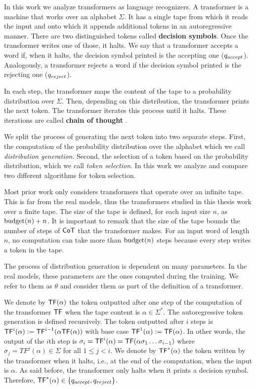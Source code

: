 In this work we analyze transformers as language recognizers.
A transformer is a machine that works over an alphabet $\Sigma$.
It has a single tape from which it reads the input and onto which it appends additional tokens in an autoregressive manner.
There are two distinguished tokens called \textbf{decision symbols}.
Once the transformer writes one of those, it halts.
We say that a transformer accepts a word if, when it halts, the decision symbol printed is the accepting one ($q_{accept}$).
Analogously, a transformer rejects a word if the decision symbol printed is the rejecting one ($q_{reject}$).

In each step, the transformer maps the content of the tape to a probability distribution over $\Sigma$.
Then, depending on this distribution, the transformer prints the next token.
The transformer iterates this process until it halts.
These iterations are called \textbf{chain of thought} \citep{wei2022chain}.

We split the process of generating the next token into two separate steps.
First, the computation of the probability distribution over the alphabet which we call \textit{distribution generation}.
Second, the selection of a token based on the probability distribution, which we call \textit{token selection}.
In this work we analyze and compare two different algorithms for token selection.

Most prior work only considers transformers that operate over an infinite tape.
This is far from the real models, thus the transformers studied in this thesis work over a finite tape.
The size of the tape is defined, for each input size $n$, as $\mathrm{budget}(n) + n$.
It is important to remark that the size of the tape bounds the number of steps of $\mathsf{CoT}$ that the transformer makes.
For an input word of length $n$, no computation can take more than $\mathrm{budget}(n)$ steps because every step writes a token in the tape.

The process of distribution generation is dependent on many parameters.
In the real models, these parameters are the ones computed during the training. 
We refer to them as $\theta$ and consider them as part of the definition of a transformer.

\medskip

We denote by $\mathsf{TF}(\alpha)$ the token outputted after one step of the computation of the transformer $\mathsf{TF}$ when the tape content is $\alpha \in \Sigma^*$.
The autoregressive token generation is defined recursively.
The token outputted after $i$ steps is $\mathsf{TF}^{i}(\alpha) := \mathsf{TF}^{i-1}(\alpha \mathsf{TF}(\alpha))$ with base case $\mathsf{TF}^1(\alpha) := \mathsf{TF}(\alpha)$.
In other words, the output of the $i$th step is $\sigma_{i} = \mathsf{TF}^{i}(\alpha) = \mathsf{TF}(\alpha\sigma_{1}\dots\sigma_{i-1})$ where $\sigma_j = TF^j(\alpha) \in \Sigma$ for all $1 \leq j < i$.
We denote by $\mathsf{TF}^*(\alpha)$ the token written by the transformer when it halts, i.e., at the end of the computation, when the input is $\alpha$.
As said before, the transformer only halts when it prints a decision symbol.
Therefore, $\mathsf{TF}^*(\alpha) \in \{q_{accept}, q_{reject}\}$.





